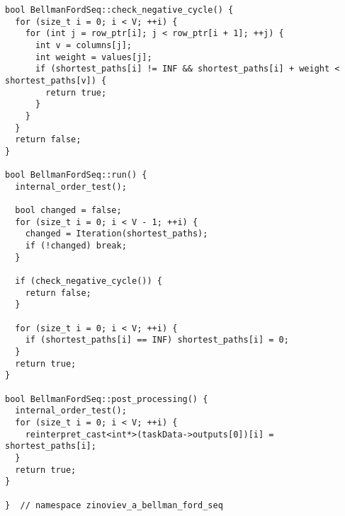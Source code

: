 \documentclass[12pt]{article}
\begin{document}
\begin{lstlisting}[caption={ops\_seq\_.cpp}]
bool BellmanFordSeq::check_negative_cycle() {
  for (size_t i = 0; i < V; ++i) {
    for (int j = row_ptr[i]; j < row_ptr[i + 1]; ++j) {
      int v = columns[j];
      int weight = values[j];
      if (shortest_paths[i] != INF && shortest_paths[i] + weight < shortest_paths[v]) {
        return true;
      }
    }
  }
  return false;
}

bool BellmanFordSeq::run() {
  internal_order_test();

  bool changed = false;
  for (size_t i = 0; i < V - 1; ++i) {
    changed = Iteration(shortest_paths);
    if (!changed) break;
  }

  if (check_negative_cycle()) {
    return false;
  }

  for (size_t i = 0; i < V; ++i) {
    if (shortest_paths[i] == INF) shortest_paths[i] = 0;
  }
  return true;
}

bool BellmanFordSeq::post_processing() {
  internal_order_test();
  for (size_t i = 0; i < V; ++i) {
    reinterpret_cast<int*>(taskData->outputs[0])[i] = shortest_paths[i];
  }
  return true;
}

}  // namespace zinoviev_a_bellman_ford_seq
\end{lstlisting}
\end{document}
